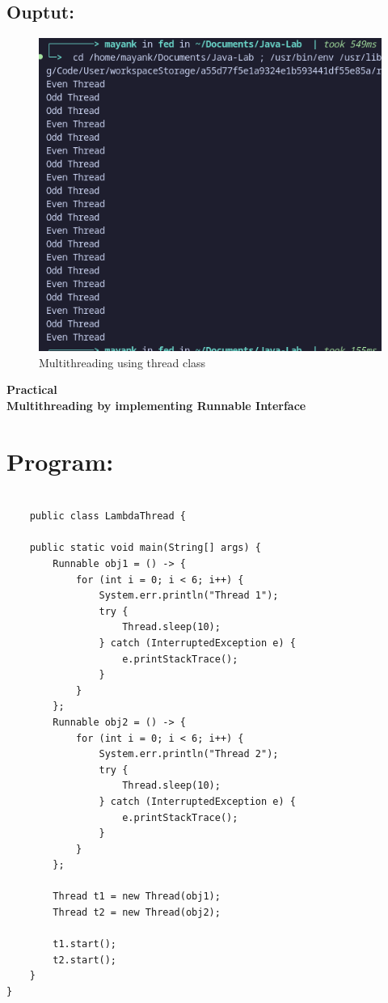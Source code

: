 \documentclass[a4paper,12pt]{article}
\newcounter{practicalno} %
\newcommand{\practicaltitle}[1]{
    \stepcounter{practicalno} %
    \newpage
    \begin{center}
        \vspace{1cm}
        \Large\textbf{Practical \thepracticalno} \\
        \vspace{0.5cm}
        \Large\textbf{#1} %
        \normalsize\vspace{1cm}
    \end{center}
}
\begin{document}
\subsection{Ouptut: }
\begin{figure}[H]
    \centering
    \includegraphics[width=0.8\linewidth]{images/Thread.png}
    \caption{Multithreading using thread class}
\end{figure}


\setcounter{section}{0}
\practicaltitle{Multithreading by implementing Runnable Interface}

\section{Program: }
\begin{lstlisting}

    public class LambdaThread {

    public static void main(String[] args) {
        Runnable obj1 = () -> {
            for (int i = 0; i < 6; i++) {
                System.err.println("Thread 1");
                try {
                    Thread.sleep(10);
                } catch (InterruptedException e) {
                    e.printStackTrace();
                }
            }
        };
        Runnable obj2 = () -> {
            for (int i = 0; i < 6; i++) {
                System.err.println("Thread 2");
                try {
                    Thread.sleep(10);
                } catch (InterruptedException e) {
                    e.printStackTrace();
                }
            }
        };

        Thread t1 = new Thread(obj1);
        Thread t2 = new Thread(obj2);

        t1.start();
        t2.start();
    }
}

\end{lstlisting}
\end{document}
